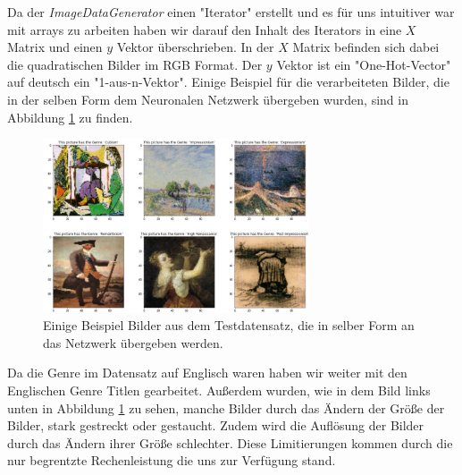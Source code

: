 Da der \textit{ImageDataGenerator} einen "Iterator" erstellt und es für uns intuitiver war mit arrays zu arbeiten haben wir darauf den Inhalt des Iterators in eine $X$ Matrix und einen $y$ Vektor überschrieben.
In der $X$ Matrix befinden sich dabei die quadratischen Bilder im RGB Format.
Der $y$ Vektor ist ein "One-Hot-Vector" auf deutsch ein "1-aus-n-Vektor".
Einige Beispiel für die verarbeiteten Bilder, die in der selben Form dem Neuronalen Netzwerk übergeben wurden, sind in Abbildung \ref{fig:beispiel_bilder} zu finden.
\begin{figure}
    \centering
    \includegraphics[width=0.7\textwidth]{content/data/beispiel.JPG}
    \caption{Einige Beispiel Bilder aus dem Testdatensatz, die in selber Form an das Netzwerk übergeben werden.}
    \label{fig:beispiel_bilder}
\end{figure}
\FloatBarrier
Da die Genre im Datensatz auf Englisch waren haben wir weiter mit den Englischen Genre Titlen gearbeitet.
Außerdem wurden, wie in dem Bild links unten in Abbildung \ref{fig:beispiel_bilder} zu sehen, manche Bilder durch das Ändern der Größe der Bilder, stark gestreckt oder gestaucht.
Zudem wird die Auflösung der Bilder durch das Ändern ihrer Größe schlechter.
Diese Limitierungen kommen durch die nur begrentzte Rechenleistung die uns zur Verfügung stand.

